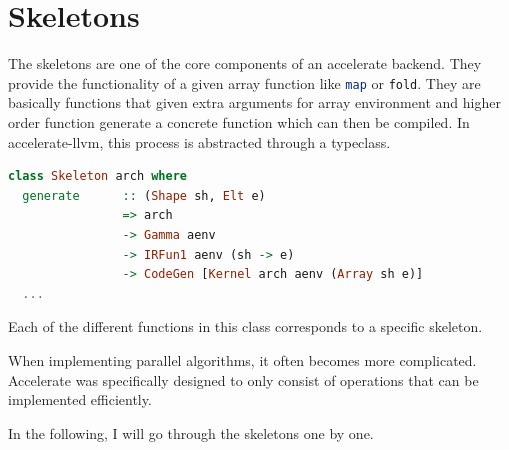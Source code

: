 \documentclass[a4paper,bibliography=totocnumbered,parskip,headsepline]{scrbook}
\begin{document}
\chapter{Skeletons}
The skeletons are one of the core components of an accelerate backend.
They provide the functionality of a given array function like \lstinline[language=haskell]!map! or \lstinline[language=haskell]!fold!.
They are basically functions that given extra arguments for array environment and higher order function generate a concrete function which can then be compiled.
In accelerate-llvm, this process is abstracted through a typeclass.
\begin{lstlisting}[language=haskell]
class Skeleton arch where
  generate      :: (Shape sh, Elt e)
                => arch
                -> Gamma aenv
                -> IRFun1 aenv (sh -> e)
                -> CodeGen [Kernel arch aenv (Array sh e)]
  ...
\end{lstlisting}
Each of the different functions in this class corresponds to a specific skeleton.

When implementing parallel algorithms, it often becomes more complicated.
Accelerate was specifically designed to only consist of operations that can be implemented efficiently.

In the following, I will go through the skeletons one by one.
\end{document}
